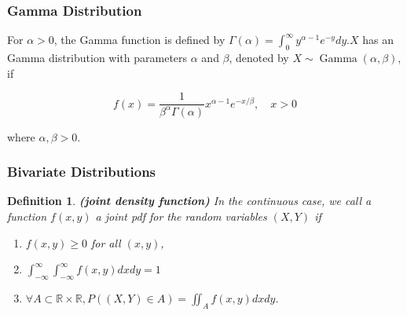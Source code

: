 \documentclass[13pt]{article}
\newtheorem{definition}[theorem]{Definition}
\theoremstyle{definition}
\theoremstyle{remark}
\begin{document}
\subsubsection{Gamma Distribution} For $\alpha>0$, the Gamma function is defined by $\Gamma(\alpha)=\int_{0}^{\infty} y^{\alpha-1} e^{-y} d y . X$ has an Gamma distribution with parameters $\alpha$ and $\beta$, denoted by $X \sim \operatorname{Gamma}(\alpha, \beta)$, if

$$
f(x)=\frac{1}{\beta^{\alpha} \Gamma(\alpha)} x^{\alpha-1} e^{-x / \beta}, \quad x>0
$$

where $\alpha, \beta>0$.

\subsubsection{Bivariate Distributions}
\begin{definition}\textbf{(joint density function)}
    In the continuous case, we call a function $f(x, y)$ a joint pdf for the random variables $(X, Y)$ if 
\begin{enumerate}[label=(\roman*)]
    \item $f(x, y) \geq 0$ for all $(x, y)$,
    \item $\int_{-\infty}^{\infty} \int_{-\infty}^{\infty} f(x, y) d x d y=1$
    \item $\forall A \subset \mathbb{R} \times \mathbb{R}, P((X, Y) \in A)=\iint_{A} f(x, y) d x d y$.
\end{enumerate}
\end{definition}
\end{document}

